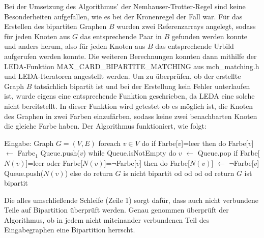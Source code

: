 Bei der Umsetzung des Algorithmus' der Nemhauser-Trotter-Regel sind keine Besonderheiten aufgefallen, wie es bei der Kronenregel der Fall war. Für das Erstellen des bipartiten Graphen $B$ wurden zwei Referenzarrays angelegt, sodass für jeden Knoten aus $G$ das entsprechende Paar in $B$ gefunden werden konnte und anders herum, also für jeden Knoten aus $B$ das entsprechende Urbild aufgerufen werden konnte. Die weiteren Berechnungen konnten dann mithilfe der LEDA-Funktion MAX\_CARD\_BIPARTITE\_MATCHING aus mcb\_matching.h und LEDA-Iteratoren angestellt werden. Um zu überprüfen, ob der erstellte Graph $B$ tatsächlich bipartit ist und bei der Erstellung kein Fehler unterlaufen ist, wurde eigens eine entsprechende Funktion geschrieben, da LEDA eine solche nicht bereitstellt. In dieser Funktion wird getestet ob es möglich ist, die Knoten des Graphen in zwei Farben einzufärben, sodass keine zwei benachbarten Knoten die gleiche Farbe haben. Der Algorithmus funktioniert, wie folgt:
\begin{singlespace}
\begin{algorithm}[caption={Bipartit-Check}, label={alg4}]
Eingabe: Graph $G=(V,E)$ 
foreach $ v \in V$ do
  if Farbe[$v$]=leer then do
    Farbe[$v$] $\leftarrow$ Farbe$_{1}$    
    Queue.push($v$)
    while Queue.isNotEmpty do
      $v$ $\leftarrow$ Queue.pop
      if Farbe[$N(v)$]=leer oder Farbe[$N(v)$]=$\neg$Farbe[$v$] then do
        Farbe[$N(v)$] $\leftarrow$ $\neg$Farbe[$v$]
        Queue.push($N(v)$)
      else do
        return $G$ is nicht bipartit
      od 
    od
  od  
od
return $G$ ist bipartit
\end{algorithm}
\end{singlespace}
Die alles umschließende Schleife (Zeile 1) sorgt dafür, dass auch nicht verbundene Teile auf Bipartition überprüft werden. Genau genommen überprüft der Algorithmus, ob in jedem nicht miteinander verbundenen Teil des Eingabegraphen eine Bipartition herrscht.





